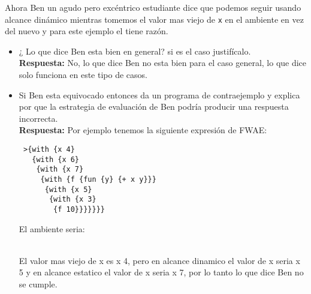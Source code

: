 \documentclass[letterpaper,11pt]{article}
\begin{document}
 Ahora Ben un agudo pero excéntrico estudiante dice que podemos seguir usando alcance dinámico mientras tomemos el valor mas viejo de \verb;x; en el ambiente en vez del nuevo y para este ejemplo el tiene razón.
 \begin{itemize}
 \item{¿ Lo que dice Ben esta bien en general? si es el caso justifícalo. }
 \\
 \textbf{Respuesta:} 
 No, lo que dice Ben no esta bien para el caso general, lo que dice solo funciona en este tipo de casos.
 \item{Si Ben esta equivocado entonces da un programa de contraejemplo y explica
 por que la estrategia de evaluación de Ben podría producir una respuesta incorrecta.}
 \\
 \textbf{Respuesta:} 
 Por ejemplo tenemos la siguiente expresión de FWAE:
\begin{verbatim}
 >{with {x 4}
   {with {x 6}
    {with {x 7}
     {with {f {fun {y} {+ x y}}}
      {with {x 5}
       {with {x 3}
        {f 10}}}}}}}
\end{verbatim}

El ambiente seria:
\\
\\
El valor mas viejo de x es x 4, pero en alcance dinamico el valor de x seria x 5 y en alcance estatico el valor de x seria x 7, por lo tanto lo que dice Ben no se cumple.

 \end{itemize}
 
\end{document}
